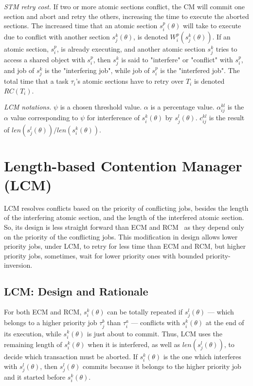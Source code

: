 \documentclass[conference]{IEEEtran}
\begin{document}
\textit{STM retry cost.} If two or more atomic sections conflict, the CM will commit one section and abort and retry the others, increasing the time to execute the aborted sections. The increased time that an atomic section $s_i^p (\theta)$ will take to execute due to conflict with another section $s_j^k (\theta)$, is denoted $W_{i}^{p}(s_{j}^{k}(\theta))$. If an atomic section, $s_i^p$, is already executing, and another atomic section $s_j^k$ tries to access a shared object with $s_i^p$, then $s_j^k$ is said to "interfere" or "conflict" with $s_i^p$, and job of $s_j^k$ is the "interfering job", while job of $s_i^p$ is the "interfered job". The total time that a task $\tau_i$'s atomic sections have to retry over $T_i$ is denoted $RC(T_i)$.

\textit{LCM notations.} $\psi$ is a chosen threshold value. $\alpha$ is a percentage value. $\alpha_{ij}^{kl}$ is the $\alpha$ value corresponding to $\psi$ for interference of $s_i^k(\theta)$ by $s_j^l(\theta)$. $c_{ij}^{kl}$ is the result of $len(s_j^l(\theta))/len(s_i^k(\theta))$.

\section{Length-based Contention Manager (LCM)}

LCM resolves conflicts based on the priority of conflicting jobs, besides the length of the interfering atomic section, and the length of the interfered atomic section. So, its design is less straight forward than ECM and RCM~\cite{stmconcurrencycontrol:emsoft11} as they depend only on the priority of the conflicting jobs. This modification in design allows lower priority jobs, under LCM, to retry for less time than ECM and RCM, but higher priority jobs, sometimes, wait for lower priority ones with bounded priority-inversion.

\subsection{\label{sec 9.1} LCM: Design and Rationale}

For both ECM and RCM, $s_{i}^{k}(\theta)$ can be totally repeated if $s_{j}^{l}(\theta)$ --- which belongs to a higher priority job $\tau_{j}^b$ than $\tau_{i}^a$ --- conflicts with $s_{i}^{k}(\theta)$
at the end of its execution, while $s_{i}^{k}(\theta)$ is just about
to commit. Thus, LCM  uses the remaining length of $s_{i}^{k}(\theta)$ when it is interfered,
as well as $len(s_{j}^{l}(\theta))$, to decide which transaction must be aborted. If $s_i^k (\theta)$ is the one which interferes with $s_j^l (\theta)$, then $s_j^l (\theta)$ commits because it belongs to the higher priority job and it started before $s_i^k (\theta)$.
\end{document}
